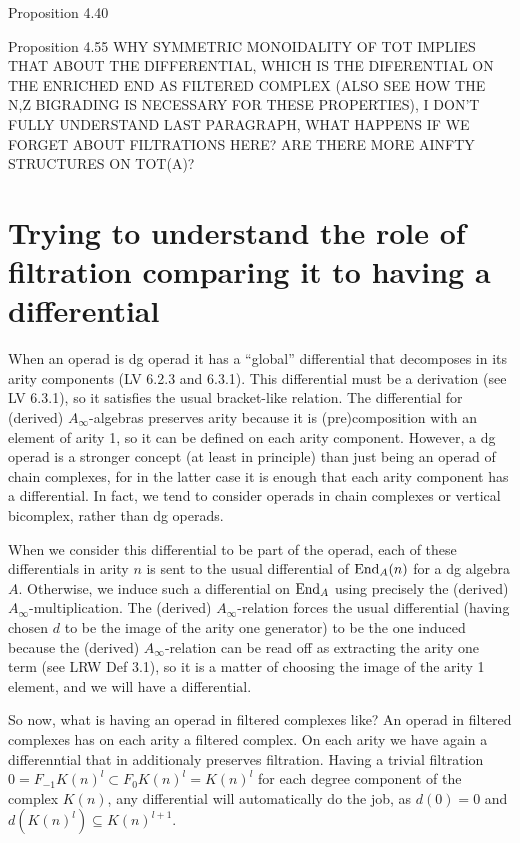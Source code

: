 \documentclass[twoside]{article}
\begin{document}
Proposition 4.40

Proposition 4.55 WHY SYMMETRIC MONOIDALITY OF TOT IMPLIES THAT ABOUT THE DIFFERENTIAL, WHICH IS THE DIFERENTIAL ON THE ENRICHED END AS FILTERED COMPLEX (ALSO SEE HOW THE N,Z BIGRADING IS NECESSARY FOR THESE PROPERTIES), I DON'T FULLY UNDERSTAND LAST PARAGRAPH, WHAT HAPPENS IF WE FORGET ABOUT FILTRATIONS HERE? ARE THERE MORE AINFTY STRUCTURES ON TOT(A)?


\section*{Trying to understand the role of filtration comparing it to having a differential}

When an operad is dg operad it has a ``global'' differential that decomposes in its arity components (LV 6.2.3 and 6.3.1). This differential must be a derivation (see LV 6.3.1), so it satisfies the usual bracket-like relation. The differential for (derived) $A_\infty$-algebras  preserves arity because it is (pre)composition with an element of arity 1, so it can be defined on each arity component. However, a dg operad is a stronger concept (at least in principle) than just being an operad of chain complexes, for in the latter case it is enough that each arity component has a differential. In fact, we tend to consider operads in chain complexes or vertical bicomplex, rather than dg operads.

When we consider this differential to be part of the operad, each of these differentials in arity $n$ is sent to the usual differential of $\operatorname{End}_A(n)$ for a dg algebra $A$. Otherwise, we induce such a differential on $\operatorname{End}_A$ using precisely the (derived) $A_\infty$-multiplication. The (derived)  $A_\infty$-relation forces the usual differential (having chosen $d$ to be the image of the arity one generator) to be the one induced  because the (derived) $A_\infty$-relation can be read off as extracting the arity one term  (see LRW Def 3.1), so it is a matter of choosing the image of the arity 1 element, and we will have a differential.

 



So now, what is having an operad in filtered complexes like? An operad in filtered complexes has on each arity a filtered complex. On each arity we have again a differenntial that in additionaly preserves filtration. Having a trivial filtration $0=F_{-1}K(n)^l\subset F_0K(n)^l=K(n)^l$ for each degree component of the complex $K(n)$, any differential will automatically do the job, as $d(0)=0$ and $d(K(n)^l)\subseteq K(n)^{l+1}$.
\end{document}
